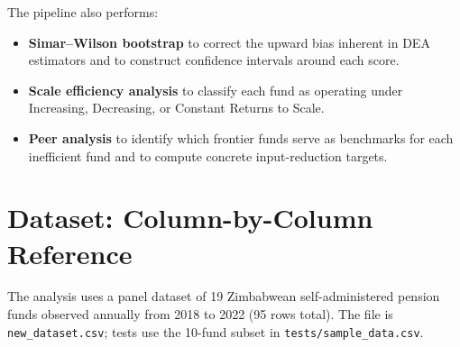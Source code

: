 \documentclass[12pt,a4paper]{article}
\begin{document}
The pipeline also performs:
\begin{itemize}
    \item \textbf{Simar--Wilson bootstrap} to correct the upward bias inherent in
          DEA estimators and to construct confidence intervals around each score.
    \item \textbf{Scale efficiency analysis} to classify each fund as operating under
          Increasing, Decreasing, or Constant Returns to Scale.
    \item \textbf{Peer analysis} to identify which frontier funds serve as benchmarks
          for each inefficient fund and to compute concrete input-reduction targets.
\end{itemize}

\section{Dataset: Column-by-Column Reference}

The analysis uses a panel dataset of 19 Zimbabwean self-administered pension funds
observed annually from 2018 to 2022 (95 rows total).  The file is
\texttt{new\_dataset.csv}; tests use the 10-fund subset in
\texttt{tests/sample\_data.csv}.
\end{document}
